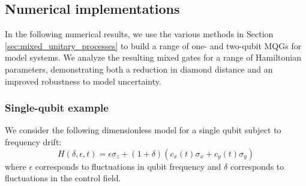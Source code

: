\documentclass[aps,nofootinbib,pra,notitlepage,twocolumn]{revtex4-1}
\newcommand{\0}{\ensuremath{\mathbf{0}}}
\begin{document}
{%
\subsection{Numerical implementations}
\label{sec:numerical_results}
\noindent In the following numerical results, we use the various methods in Section \ref{sec:mixed_unitary_processes} to build a range of one- and two-qubit MQGs for model systems. We analyze the resulting mixed gates for a range of Hamiltonian parameters, demonstrating both a reduction in diamond distance and an improved robustness to model uncertainty. 

\subsubsection{Single-qubit example} 
\label{sub:one_qubit}
We consider the following dimensionless model for a single qubit subject to frequency drift: 
\begin{equation}\label{eq:1Qham}
  H(\delta, \epsilon, t) = \epsilon\sigma_z + (1 + \delta)(c_x(t)\sigma_x + c_y(t)\sigma_y)
\end{equation}
where $\epsilon$ corresponds to fluctuations in qubit frequency and $\delta$ corresponds to fluctuations in the control field.

}
\end{document}
